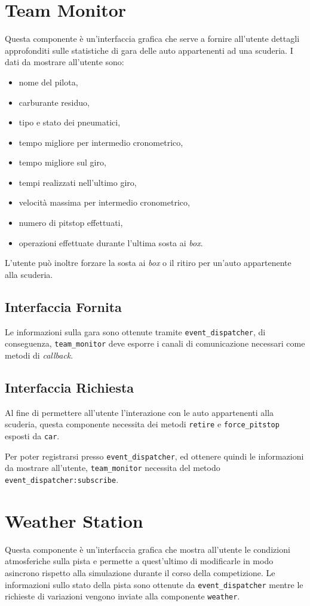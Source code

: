\documentclass[11pt,a4paper]{report}
\newcommand{\fun}[1]{\texttt{#1}}
\begin{document}
\section{Team Monitor}
Questa componente è un'interfaccia grafica che serve a fornire all'utente dettagli approfonditi sulle statistiche di gara delle auto appartenenti ad una scuderia.
I dati da mostrare all'utente sono:
\begin{itemize}
\item nome del pilota,
\item carburante residuo,
\item tipo e stato dei pneumatici,
\item tempo migliore per intermedio cronometrico,
\item tempo migliore sul giro,
\item tempi realizzati nell'ultimo giro,
\item velocità massima per intermedio cronometrico,
\item numero di pitstop effettuati,
\item operazioni effettuate durante l'ultima sosta ai \textit{box}.
\end{itemize}
L'utente può inoltre forzare la sosta ai \textit{box} o il ritiro per un'auto appartenente alla scuderia.

\subsection*{Interfaccia Fornita}
Le informazioni sulla gara sono ottenute tramite \texttt{event\_dispatcher}, di conseguenza, \texttt{team\_monitor} deve esporre i canali di comunicazione necessari come metodi di \textit{callback}.
\subsection*{Interfaccia Richiesta}
Al fine di permettere all'utente l'interazione con le auto appartenenti alla scuderia, questa componente necessita dei metodi \fun{retire} e \fun{force\_pitstop} esposti da \texttt{car}.

Per poter registrarsi presso \texttt{event\_dispatcher}, ed ottenere quindi le informazioni da mostrare all'utente, \texttt{team\_monitor} necessita del metodo \fun{event\_dispatcher:subscribe}.

\section{Weather Station}
Questa componente è un'interfaccia grafica che mostra all'utente le condizioni atmosferiche sulla pista e permette a quest'ultimo di modificarle in modo asincrono rispetto alla simulazione durante il corso della competizione. Le informazioni sullo stato della pista sono ottenute da \texttt{event\_dispatcher} mentre le richieste di variazioni vengono inviate alla componente \texttt{weather}.
\end{document}
